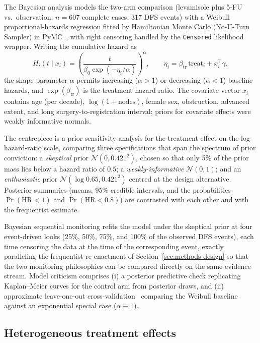 The Bayesian analysis models the two-arm comparison (levamisole plus
5-FU vs.\ observation; $n = 607$ complete cases; 317 DFS events) with a
Weibull proportional-hazards regression fitted by Hamiltonian Monte
Carlo (No-U-Turn Sampler) in PyMC~\cite{salvatier2016}, with right censoring
handled by the \texttt{Censored} likelihood wrapper. Writing the
cumulative hazard as
\begin{equation}
H_i(t \mid x_i) = \left(\frac{t}{\beta_0 \exp(-\eta_i/\alpha)}\right)^{\alpha},
\qquad
\eta_i = \beta_{\mathrm{tr}}\,\mathrm{treat}_i + x_i^{\top}\gamma,
\label{eq:weibull}
\end{equation}
the shape parameter $\alpha$ permits increasing ($\alpha>1$) or
decreasing ($\alpha<1$) baseline hazards, and $\exp(\beta_{\mathrm{tr}})$
is the treatment hazard ratio. The covariate vector $x_i$ contains
age (per decade), $\log(1+\text{nodes})$, female sex, obstruction,
advanced extent, and long surgery-to-registration interval; priors for
covariate effects were weakly informative normals.

The centrepiece is a prior sensitivity analysis for the treatment
effect on the log-hazard-ratio scale, comparing three specifications
that span the spectrum of prior conviction: a \emph{skeptical} prior
$\mathcal{N}(0, 0.421^2)$, chosen so that only 5\% of the prior mass
lies below a hazard ratio of $0.5$; a \emph{weakly-informative}
$\mathcal{N}(0, 1)$; and an \emph{enthusiastic} prior
$\mathcal{N}(\log 0.65, 0.421^2)$ centred at the design alternative.
Posterior summaries (means, 95\% credible intervals, and the
probabilities $\Pr(\mathrm{HR}<1)$ and $\Pr(\mathrm{HR}<0.8)$) are
contrasted with each other and with the frequentist estimate.

Bayesian sequential monitoring refits the model under the skeptical
prior at four event-driven looks (25\%, 50\%, 75\%, and 100\% of the
observed DFS events), each time censoring the data at the time of the
corresponding event, exactly paralleling the frequentist re-enactment of
Section~\ref{sec:methods-design} so that the two monitoring philosophies
can be compared directly on the same evidence stream. Model criticism
comprises (i) a posterior predictive check replicating Kaplan--Meier
curves for the control arm from posterior draws, and (ii) approximate
leave-one-out cross-validation~\cite{vehtari2017} comparing the Weibull
baseline against an exponential special case ($\alpha \equiv 1$).

\subsection{Heterogeneous treatment effects}\label{sec:methods-cate}

